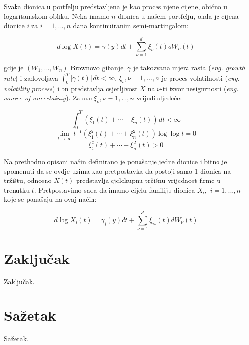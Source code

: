 \documentclass[times, utf8, seminar]{fer}
\begin{document}
Svaka dionica u portfelju predstavljena je kao proces njene cijene, obično u logaritamskom obliku. Neka imamo $n$ dionica u našem portfelju, onda je cijena dionice $i$ za $i=1,...,n$ dana kontinuiranim semi-martingalom:

\[ d \log X(t) = \gamma(y)dt + \sum_{\nu=1}^{d}\xi_{\nu}(t)dW_{\nu}(t) \]

gdje je $(W_1,...,W_n)$ Brownovo gibanje, $\gamma$ je takozvana mjera rasta (\textit{eng. growth rate}) i zadovoljava \(\int_{0}^{T} |\gamma(t)| \,dt < \infty\). \(\xi_{\nu}, \nu = 1,...,n\) je proces volatilnosti (\textit{eng. volatility process}) i on predstavlja osjetljivost \(X\) na \(\nu\)-ti izvor nesigurnosti (\textit{eng. source of uncertainty}).
Za sve \(\xi_{\nu}, \nu = 1,...,n\) vrijedi sljedeće:

\[ \int_{0}^{T} (\xi_1(t) + \cdots + \xi_n(t)) \,dt < \infty\]
\[ \lim_{t\to\infty} t^{-1}(\xi_1^2(t) + \cdots + \xi_n^2(t))\log\log t = 0 \]
\[ \xi_1^2(t) + \cdots + \xi_n^2(t) > 0 \]



Na prethodno opisani način definirano je ponašanje jedne dionice i bitno je spomenuti da se ovdje uzima kao pretpostavka da postoji samo 1 dionica na tržištu, odnosno \(X(t)\) predstavlja cjelokupnu tržišnu vrijednost firme u trenutku $t$.
Pretpostavimo sada da imamo cijelu familiju dionica \(X_i,\) \(i = 1,...,n\) koje  se ponašaju na ovaj način:

\[ d \log X_i(t) = \gamma_i(y)dt + \sum_{\nu=1}^{d}\xi_{i\nu}(t)dW_{\nu}(t) \]


\chapter{Zaključak}
Zaključak.




\chapter{Sažetak}
Sažetak.
\end{document}
